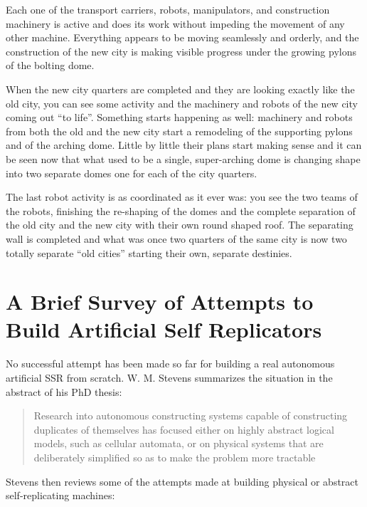 Each one of the transport carriers, robots, manipulators, and
construction machinery is active and does its work without impeding the
movement of any other machine. Everything appears to be moving
seamlessly and orderly, and the construction of the new city is making
visible progress under the growing pylons of the bolting dome.

When the new city quarters are completed and they are looking exactly
like the old city, you can see some activity and the machinery and
robots of the new city coming out “to life”. Something starts happening
as well: machinery and robots from both the old and the new city start
a remodeling of the supporting pylons and of the arching dome. Little
by little their plans start making sense and it can be seen now that
what used to be a single, super-arching dome is changing shape into two
separate domes one for each of the city quarters.

The last robot activity is as coordinated as it ever was: you see the
two teams of the robots, finishing the re-shaping of the domes and the
complete separation of the old city and the new city with their own
round shaped roof. The separating wall is completed and what was 
once two quarters of the same city is now two totally separate “old cities” 
starting their own, separate destinies.

\section{A Brief Survey of Attempts to Build Artificial Self Replicators}

No successful attempt has been made so far for building a real
autonomous artificial SSR from scratch. W. M. Stevens summarizes the
situation in the abstract of his PhD thesis:

\begin{quote}
Research into autonomous constructing systems capable of constructing
duplicates of themselves has focused either on highly abstract logical models, such as
cellular automata, or on physical systems that are deliberately simplified so as to make
the problem more tractable\citep{stevens2009}
\end{quote}

Stevens then reviews some of the attempts made at building physical or
abstract self-replicating machines:

